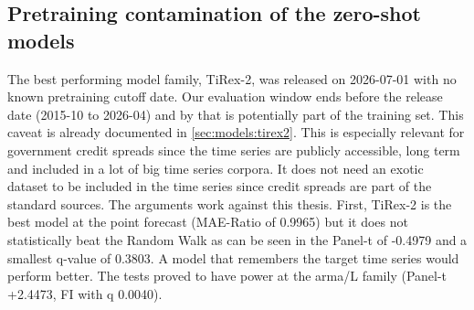 \subsection{Pretraining contamination of the zero-shot models}
\label{sec:lim:contamination}
%
The best performing model family, TiRex-2, was released on 2026-07-01 with no known pretraining cutoff date. Our evaluation window ends before the release date (2015-10 to 2026-04) and by that is potentially part of the training set. This caveat is already documented in \cref{sec:models:tirex2}.
This is especially relevant for government credit spreads since the time series are publicly accessible, long term and included in a lot of big time series corpora. It does not need an exotic dataset to be included in the time series since credit spreads are part of the standard sources.
The arguments work against this thesis. First, TiRex-2 is the best model at the point forecast (MAE-Ratio of 0.9965) but it does not statistically beat the Random Walk as can be seen in the Panel-t of -0.4979 and a smallest q-value of 0.3803. A model that remembers the target time series would perform better. The tests proved to have power at the arma/L family (Panel-t +2.4473, FI with q 0.0040).
